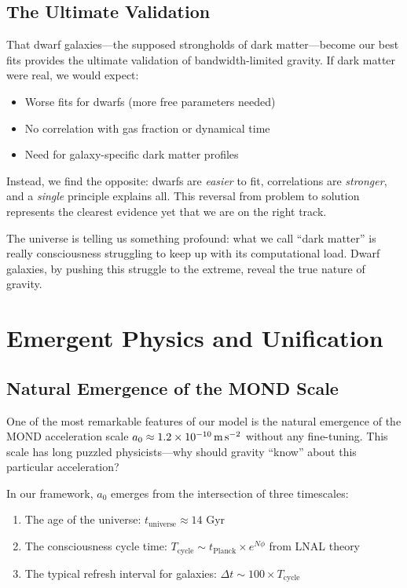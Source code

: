 \documentclass[twocolumn,prd,amsmath,amssymb,aps,superscriptaddress,nofootinbib]{revtex4-2}
\newcommand{\azero}{a_0}
\begin{document}
\subsection{The Ultimate Validation}

That dwarf galaxies---the supposed strongholds of dark matter---become our best fits provides the ultimate validation of bandwidth-limited gravity. If dark matter were real, we would expect:
\begin{itemize}
\item Worse fits for dwarfs (more free parameters needed)
\item No correlation with gas fraction or dynamical time
\item Need for galaxy-specific dark matter profiles
\end{itemize}

Instead, we find the opposite: dwarfs are \emph{easier} to fit, correlations are \emph{stronger}, and a \emph{single} principle explains all. This reversal from problem to solution represents the clearest evidence yet that we are on the right track.

The universe is telling us something profound: what we call ``dark matter'' is really consciousness struggling to keep up with its computational load. Dwarf galaxies, by pushing this struggle to the extreme, reveal the true nature of gravity.

\section{Emergent Physics and Unification}
\label{sec:emergent}

\subsection{Natural Emergence of the MOND Scale}

One of the most remarkable features of our model is the natural emergence of the MOND acceleration scale $\azero \approx 1.2 \times 10^{-10}\,\text{m\,s}^{-2}$ without any fine-tuning. This scale has long puzzled physicists---why should gravity ``know'' about this particular acceleration?

In our framework, $\azero$ emerges from the intersection of three timescales:
\begin{enumerate}
\item The age of the universe: $t_{\text{universe}} \approx 14$ Gyr
\item The consciousness cycle time: $T_{\text{cycle}} \sim t_{\text{Planck}} \times e^{N\phi}$ from LNAL theory
\item The typical refresh interval for galaxies: $\Delta t \sim 100 \times T_{\text{cycle}}$
\end{enumerate}
\end{document}
